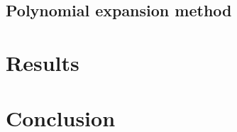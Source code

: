 \documentclass[]{article}
\begin{document}
\subsection{Polynomial expansion method}


\section{Results}


\section{Conclusion}






\end{document}
